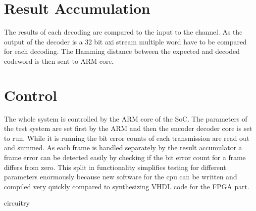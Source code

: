 \section{Result Accumulation}
The results of each decoding are compared to the input to the channel. As the output of the decoder is a 32 bit axi stream multiple word have to be compared for each decoding. The Hamming distance between the expected and decoded codeword is then sent to ARM core.

\section{Control}
The whole system is controlled by the ARM core of the SoC. The parameters of the test system are set first by the ARM and then the encoder decoder core is set to run. While it is running the bit error counts of each transmission are read out and summed. As each frame is handled separately by the result accumulator a frame error can be detected easily by checking if the bit error count for a frame differs from zero. This split in functionality simplifies testing for different parameters enormously because new software for the cpu can be written and compiled very quickly compared to synthesizing VHDL code for the FPGA part.

circuitry
